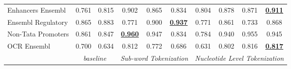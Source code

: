 \begin{table*}[h!]
\begin{center}
\begin{tabular}{l|cc|ccc|cccc}
Enhancers Ensembl & 0.761 & 0.815 & 0.902 & 0.865 & 0.834 & 0.804 & 0.878 & 0.871 & {\ul \textbf{0.911}} \\
Ensembl Regulatory & 0.865 & 0.883 & 0.771 & 0.900 & {\ul \textbf{0.937}} & 0.771 & 0.861 & 0.733 & 0.868 \\
Non-Tata Promoters & 0.861 & 0.847 & {\ul \textbf{0.960}} & 0.947 & 0.834 & 0.784 & 0.940 & 0.955 & 0.945 \\
OCR Ensembl & 0.700 & 0.634 & 0.812 & 0.772 & 0.686 & 0.631 & 0.802 & 0.816 & {\ul \textbf{0.817}} \\
\hline
\multicolumn{1}{l|}{} & \multicolumn{2}{c|}{\textit{baseline}} & \multicolumn{3}{c|}{\textit{Sub-word Tokenization}} & \multicolumn{4}{c}{\textit{Nucleotide Level Tokenization}} \\ \hline
\end{tabular}
\end{center}
\end{table*}